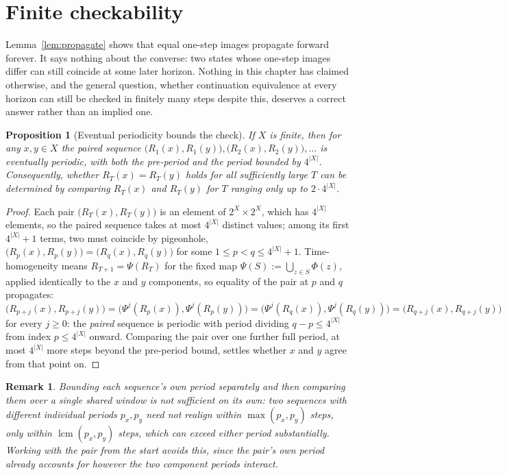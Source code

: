 \documentclass[11pt]{report}
\newtheorem{proposition}{Proposition}[chapter]
\newtheorem{remark}{Remark}[chapter]
\begin{document}
\section*{Finite checkability}

Lemma~\ref{lem:propagate} shows that equal one-step images propagate
forward forever. It says nothing about the converse: two states whose
one-step images differ can still coincide at some later horizon.
Nothing in this chapter has claimed otherwise, and the general
question, whether continuation equivalence at every horizon can still
be checked in finitely many steps despite this, deserves a correct
answer rather than an implied one.

\begin{proposition}[Eventual periodicity bounds the check]
\label{prop:periodicity}
If $X$ is finite, then for any $x, y \in X$ the paired sequence
$\big(R_1(x),R_1(y)\big), \big(R_2(x),R_2(y)\big), \dots$ is eventually
periodic, with both the pre-period and the period bounded by
$4^{|X|}$. Consequently, whether $R_T(x) = R_T(y)$ holds for all
sufficiently large $T$ can be determined by comparing $R_T(x)$ and
$R_T(y)$ for $T$ ranging only up to $2 \cdot 4^{|X|}$.
\end{proposition}
\begin{proof}
Each pair $\big(R_T(x), R_T(y)\big)$ is an element of $2^X \times 2^X$,
which has $4^{|X|}$ elements, so the paired sequence takes at most
$4^{|X|}$ distinct values; among its first $4^{|X|}+1$ terms, two must
coincide by pigeonhole, $\big(R_p(x),R_p(y)\big) =
\big(R_q(x),R_q(y)\big)$ for some $1 \leq p < q \leq 4^{|X|}+1$.
Time-homogeneity means $R_{T+1} = \Psi(R_T)$ for the fixed map
$\Psi(S) := \bigcup_{z \in S} \Phi(z)$, applied identically to the $x$
and $y$ components, so equality of the pair at $p$ and $q$ propagates:
$\big(R_{p+j}(x), R_{p+j}(y)\big) = \big(\Psi^j(R_p(x)), \Psi^j(R_p(y))\big)
= \big(\Psi^j(R_q(x)), \Psi^j(R_q(y))\big) = \big(R_{q+j}(x), R_{q+j}(y)\big)$
for every $j \geq 0$: the \emph{paired} sequence is periodic with
period dividing $q - p \leq 4^{|X|}$ from index $p \leq 4^{|X|}$
onward. Comparing the pair over one further full period, at most
$4^{|X|}$ more steps beyond the pre-period bound, settles whether $x$
and $y$ agree from that point on.
\end{proof}

\begin{remark}
Bounding each sequence's own period separately and then comparing
them over a single shared window is not sufficient on its own: two
sequences with different individual periods $p_x, p_y$ need not
realign within $\max(p_x,p_y)$ steps, only within
$\operatorname{lcm}(p_x,p_y)$ steps, which can exceed either period
substantially. Working with the pair from the start avoids this,
since the pair's own period already accounts for however the two
component periods interact.
\end{remark}
\end{document}
